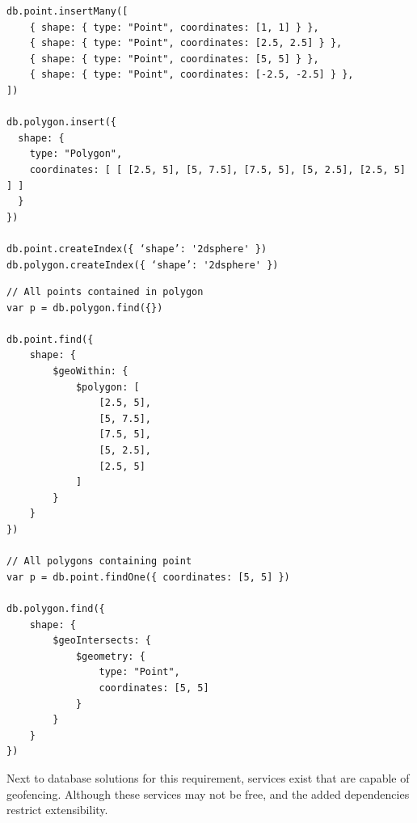 \begin{Verbatim}[fontsize=\scriptsize]
db.point.insertMany([
	{ shape: { type: "Point", coordinates: [1, 1] } },
	{ shape: { type: "Point", coordinates: [2.5, 2.5] } },
	{ shape: { type: "Point", coordinates: [5, 5] } },
	{ shape: { type: "Point", coordinates: [-2.5, -2.5] } },
])

db.polygon.insert({
  shape: {
    type: "Polygon",
    coordinates: [ [ [2.5, 5], [5, 7.5], [7.5, 5], [5, 2.5], [2.5, 5] ] ]
  }
})

db.point.createIndex({ ‘shape’: '2dsphere' })
db.polygon.createIndex({ ‘shape’: '2dsphere' })
\end{Verbatim}

\begin{Verbatim}[fontsize=\scriptsize]
// All points contained in polygon
var p = db.polygon.find({})

db.point.find({
    shape: {
        $geoWithin: {
            $polygon: [
                [2.5, 5],
                [5, 7.5],
                [7.5, 5],
                [5, 2.5],
                [2.5, 5]
            ]
        }
    }
})

// All polygons containing point
var p = db.point.findOne({ coordinates: [5, 5] })

db.polygon.find({
    shape: {
        $geoIntersects: {
            $geometry: {
                type: "Point",
                coordinates: [5, 5]
            }
        }
    }
})
\end{Verbatim}

Next to database solutions for this requirement, services exist that are capable of geofencing. Although these services may not be free, and the added dependencies restrict extensibility.

%
